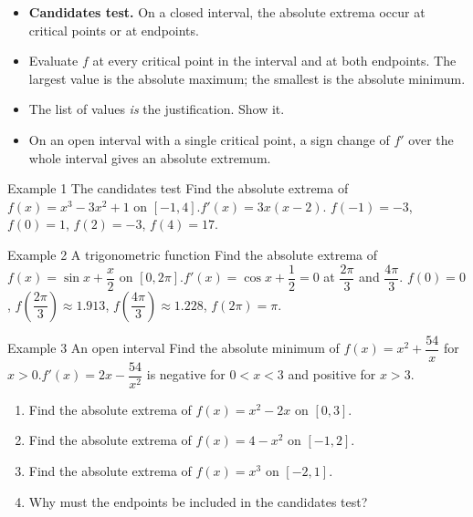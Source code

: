 \documentclass[11pt]{article}
\begin{document}

\begin{ideabox}
\begin{itemize}[leftmargin=*,itemsep=2pt,topsep=2pt]
  \item \textbf{Candidates test.} On a closed interval, the absolute extrema occur at critical points or at endpoints.
  \item Evaluate $f$ at every critical point in the interval and at both endpoints. The largest value is the absolute maximum; the smallest is the absolute minimum.
  \item The list of values \emph{is} the justification. Show it.
  \item On an open interval with a single critical point, a sign change of $f'$ over the whole interval gives an absolute extremum.
\end{itemize}
\end{ideabox}

\begin{example}{Example 1 \textperiodcentered{} The candidates test}
Find the absolute extrema of $f(x)=x^3-3x^2+1$ on $[-1,4]$.\soln $f'(x)=3x(x-2)$. $f(-1)=-3$, $f(0)=1$, $f(2)=-3$, $f(4)=17$.
\end{example}

\begin{example}{Example 2 \textperiodcentered{} A trigonometric function}
Find the absolute extrema of $f(x)=\sin x+\dfrac x2$ on $[0,2\pi]$.\soln $f'(x)=\cos x+\dfrac12=0$ at $\dfrac{2\pi}{3}$ and $\dfrac{4\pi}{3}$. $f(0)=0$, $f\!\left(\dfrac{2\pi}{3}\right)\approx1.913$, $f\!\left(\dfrac{4\pi}{3}\right)\approx1.228$, $f(2\pi)=\pi$.
\end{example}

\begin{example}{Example 3 \textperiodcentered{} An open interval}
Find the absolute minimum of $f(x)=x^2+\dfrac{54}{x}$ for $x>0$.\soln $f'(x)=2x-\dfrac{54}{x^2}$ is negative for $0<x<3$ and positive for $x>3$.
\end{example}

\newpage
{}

\begin{enumerate}[leftmargin=*,itemsep=2pt]
  \item Find the absolute extrema of $f(x)=x^2-2x$ on $[0,3]$.\work{2.3cm}
  \item Find the absolute extrema of $f(x)=4-x^2$ on $[-1,2]$.\work{2.3cm}
  \item Find the absolute extrema of $f(x)=x^3$ on $[-2,1]$.\work{2.3cm}
  \item Why must the endpoints be included in the candidates test?\work{2.3cm}
\end{enumerate}
\end{document}

